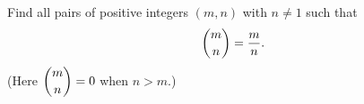 Find all pairs of positive integers $(m,n)$ with $n\ne1$ such that
\[\dbinom mn=\dfrac mn.\]
(Here $\dbinom mn=0$ when $n>m$.)
